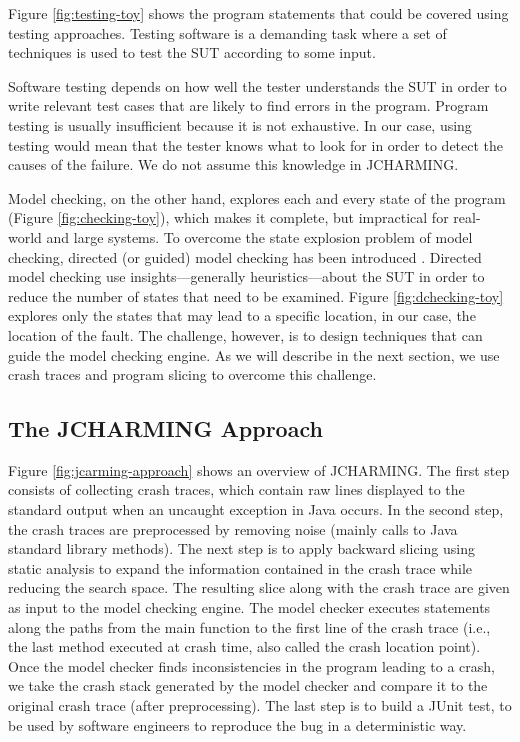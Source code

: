 Figure \ref{fig:testing-toy} shows the program statements that could be covered using testing approaches. Testing software is a demanding task where a set of techniques is used to test the SUT according to some input.

Software testing depends on how well the tester understands the SUT in order to write relevant test cases that are likely to find errors in the program. Program testing is usually insufficient because it is not exhaustive. In our case, using testing would mean that the tester knows what to look for in order to detect the causes of the failure. We do not assume this knowledge in JCHARMING.

Model checking, on the other hand, explores each and every state of the program (Figure \ref{fig:checking-toy}), which makes it complete, but impractical for real-world and large systems. To overcome the state explosion problem of model checking, directed (or guided) model checking has been introduced \cite{Rungta2009}. Directed model checking use insights—generally heuristics—about the SUT in order to reduce the number of states that need to be examined. Figure \ref{fig:dchecking-toy} explores only the states that may lead to a specific location, in our case, the location of the fault. The challenge, however, is to design techniques that can guide the model checking engine. As we will describe in the next section, we use crash traces and program slicing to overcome this challenge.

\subsection{The JCHARMING Approach}

Figure \ref{fig:jcarming-approach} shows an overview of JCHARMING. The first step
consists of collecting crash traces, which contain raw lines
displayed to the standard output when an uncaught exception
in Java occurs. In the second step, the crash traces are
preprocessed by removing noise (mainly calls to Java standard
library methods). The next step is to apply backward slicing
using static analysis to expand the information contained in
the crash trace while reducing the search space. The resulting
slice along with the crash trace are given as input to the model
checking engine. The model checker executes statements
along the paths from the main function to the first line of the
crash trace (i.e., the last method executed at crash time, also
called the crash location point). Once the model checker finds
inconsistencies in the program leading to a crash, we take the
crash stack generated by the model checker and compare it to
the original crash trace (after preprocessing). The last step is
to build a JUnit test, to be used by software engineers to
reproduce the bug in a deterministic way.

